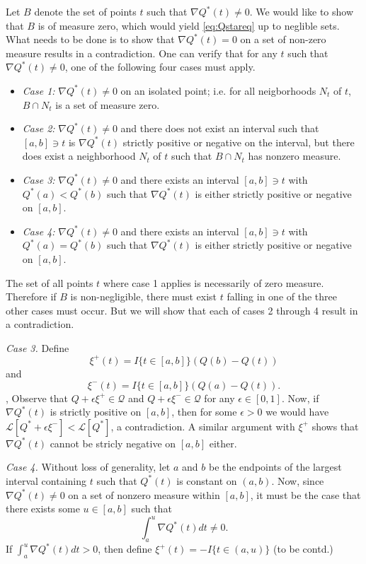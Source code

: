 \documentclass[12pt]{article}
\begin{document}
Let $B$ denote the set of points $t$ such that $\nabla Q^*(t) \neq 0$.
We would like to show that $B$ is of measure zero, which would
yield \eqref{eq:Qstareq} up to neglible sets.  What needs to be done
is to show that $\nabla Q^*(t) = 0$ on a set of non-zero measure
results in a contradiction.  One can verify that for any $t$ such that
$\nabla Q^*(t) \neq 0$, one of the following four cases must apply.
\begin{itemize}
\item \emph{Case 1:} $\nabla Q^*(t) \neq 0$ on an isolated point; i.e. for all neigborhoods $N_t$ of $t$, $B \cap N_t$ is a set of measure zero.
\item \emph{Case 2:} $\nabla Q^*(t) \neq 0$ and there does not exist an interval such that
$[a, b] \ni t$ is $\nabla Q^*(t)$ strictly positive or negative on the
interval, but there does exist a neighborhood $N_t$ of $t$ such that $B \cap N_t$ has nonzero measure.
\item \emph{Case 3:}  $\nabla Q^*(t) \neq 0$ and there exists an interval
 $[a, b] \ni t$ with $Q^*(a) < Q^*(b)$ such that $\nabla Q^*(t)$ is
 either strictly positive or negative on $[a,b]$.
\item \emph{Case 4:} $\nabla Q^*(t) \neq 0$ and there exists an interval
 $[a, b] \ni t$ with $Q^*(a) = Q^*(b)$ such that $\nabla Q^*(t)$ is
 either strictly positive or negative on $[a,b]$.
\end{itemize}
The set of all points $t$ where case 1 applies is necessarily of zero
measure.  Therefore if $B$ is non-negligible, there must exist $t$
falling in one of the three other cases must occur.  But we will show that 
each of cases 2 through 4 result in a contradiction.

\emph{Case 3.}
Define
\[
\xi^+(t) = I\{t \in [a,b]\} (Q(b) - Q(t))
\]
and
\[
\xi^-(t) = I\{t \in [a,b]\} (Q(a) - Q(t)).
\],
Observe that $Q + \epsilon \xi^+ \in \mathcal{Q}$ and $Q
+ \epsilon \xi^- \in \mathcal{Q}$ for any $\epsilon \in [0,1]$.  Now,
if $\nabla Q^*(t)$ is strictly positive on $[a,b]$, then for some
$\epsilon > 0$ we would have $\mathcal{L}[Q^* + \epsilon \xi^-]
< \mathcal{L}[Q^*]$, a contradiction.  A similar argument with $\xi^+$
shows that $\nabla Q^*(t)$ cannot be stricly negative on $[a, b]$
either.

\emph{Case 4.}
Without loss of generality, let $a$ and $b$ be the endpoints of the
largest interval containing $t$ such that $Q^*(t)$ is constant on $(a,
b)$.  Now, since $\nabla Q^*(t) \neq 0$ on a set of nonzero measure
within $[a, b]$, it must be the case that there exists some $u \in [a,
b]$ such that
\[
\int_a^u \nabla Q^*(t) dt \neq 0.
\]
If $\int_a^u \nabla Q^*(t) dt > 0$, then define $\xi^+(t) = -I\{t \in
(a, u)\}$ (to be contd.)
\end{document}
